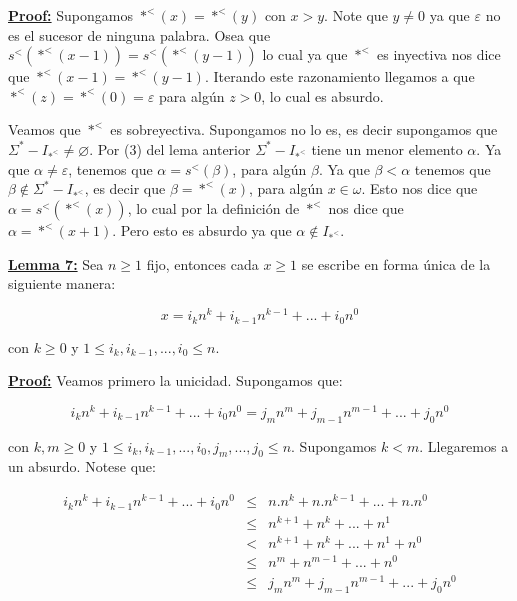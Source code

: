   \textbf{\underline{Proof:}} Supongamos $\ast^{<}(x) = \ast^{<}(y)$ con $x > y$. Note que $y \neq 0$ ya que
    $\varepsilon$ no es el sucesor de ninguna palabra. Osea que $s^{<}(\ast^{<}(x-1)) = s^{<}(\ast^{<}(y-1))$ lo
    cual ya que $\ast^{<}$ es inyectiva nos dice que $\ast^{<}(x-1) = \ast^{<}(y-1)$. Iterando este razonamiento
    llegamos a que $\ast^{<}(z) = \ast^{<}(0) = \varepsilon$ para algún $z > 0$, lo cual es absurdo.

    \par Veamos que $\ast^{<}$ es sobreyectiva. Supongamos no lo es, es decir supongamos que
    $\Sigma^{\ast}-I_{\ast^{<}} \neq \varnothing$. Por (3) del lema anterior $\Sigma^{\ast}-I_{\ast^{<}}$ tiene un
    menor elemento $\alpha$. Ya que $\alpha \neq \varepsilon$, tenemos que $\alpha = s^{<}(\beta)$, para algún $\beta$.
    Ya que $\beta < \alpha$ tenemos que $\beta \notin \Sigma^{\ast}-I_{\ast^{<}}$, es decir que $\beta = \ast^{<}(x)$,
    para algún $x \in \omega$. Esto nos dice que $\alpha = s^{<}(\ast^{<}(x))$, lo cual por la definición de
    $\ast^{<}$ nos dice que $\alpha = \ast^{<}(x+1)$. Pero esto es absurdo ya que $\alpha \notin I_{\ast^{<}}$.

  \QED


  \textbf{\underline{Lemma 7:}} Sea $n \geq 1$ fijo, entonces cada $x \geq 1$ se escribe en forma única de la siguiente
    manera:

    \[
      x = i_{k} n^{k} + i_{k-1} n^{k-1} + ... + i_{0} n^{0}
    \]

    \par con $k\geq 0$ y $1\leq i_{k}, i_{k-1},...,i_{0}\leq n$.

  \textbf{\underline{Proof:}} Veamos primero la unicidad. Supongamos que:

    \[
      i_{k} n^{k} + i_{k-1} n^{k-1} + ... + i_{0} n^{0} = j_{m} n^{m} + j_{m-1} n^{m-1} + ... + j_{0} n^{0}
    \]

    \par con $k, m \geq 0$ y $1 \leq i_{k}, i_{k-1}, ..., i_{0}, j_{m}, ..., j_{0} \leq n$. Supongamos $k < m$.
    Llegaremos a un absurdo. Notese que:

    \begin{eqnarray}
    	\nonumber i_{k} n^{k} + i_{k-1} n^{k-1} + ... + i_{0}n^{0} &\leq& n.n^{k} + n.n^{k-1} +... + n.n^{0} \\
    	\nonumber &\leq& n^{k+1} + n^{k} + ... + n^{1} \\
      \nonumber &<& n^{k+1} + n^{k}+ ... + n^{1} + n^{0} \\
      \nonumber &\leq& n^{m} + n^{m-1} + ... + n^{0} \\
      \nonumber &\leq& j_{m}n^{m}+j_{m-1}n^{m-1}+...+j_{0}n^{0}
		\end{eqnarray}

